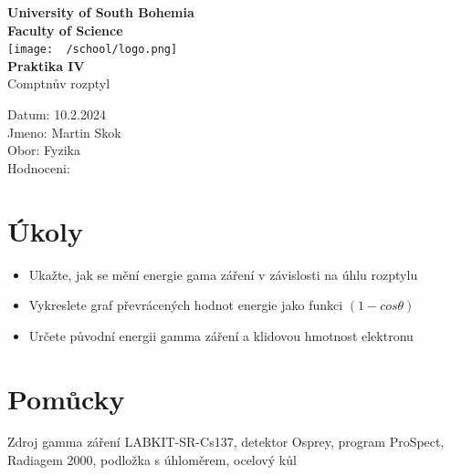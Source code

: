\documentclass{article}
\begin{document}
\begin{center}
\textbf{\Huge{University of South Bohemia}}\\
\vspace{50px}
\textbf{\Large{Faculty of Science}} \\
\vspace{30px}
\texttt{[image: ~/school/logo.png]} \\
\vspace{30px}
\textbf{\large{Praktika IV}}
\vspace{20px}
\\
\vspace{20px}
\large{Comptnův rozptyl} \\
\vspace{60px}
\end{center}
\begin{flushleft}
Datum: 10.2.2024 \\
Jmeno: Martin Skok \\
Obor: Fyzika \\
Hodnoceni:
\end{flushleft}
\newpage
\section{Úkoly}
\begin{itemize}
  \item Ukažte, jak se mění energie gama záření v závislosti na úhlu rozptylu
  \item Vykreslete graf převrácených hodnot energie jako funkci $(1-cos\theta)$
  \item Určete původní energii gamma záření a klidovou hmotnost elektronu
\end{itemize}
\section{Pomůcky}
Zdroj gamma záření LABKIT-SR-Cs137, detektor Osprey, program ProSpect, Radiagem
2000, podložka s úhloměrem, ocelový kůl
\end{document}
